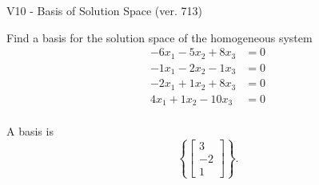 \begin{exercise}
  \begin{exerciseTitle}V10 - Basis of Solution Space (ver. 713)\end{exerciseTitle}
  \begin{exerciseStatement}
    Find a basis for the solution space of the homogeneous system 
\begin{align*}
 -6 x_ 1 -5 x_ 2 + 8 x_ 3 &= 0  \\ 
  -1 x_ 1 -2 x_ 2 -1 x_ 3 &= 0  \\ 
  -2 x_ 1 + 1 x_ 2 + 8 x_ 3 &= 0  \\ 
  4 x_ 1 + 1 x_ 2 -10 x_ 3 &= 0  \\ 
 \end{align*}


 
  \end{exerciseStatement}

  \begin{exerciseAnswer}
   A basis is   
\[\left\{\left[\begin{array}{c}
3 \\
-2 \\
1
\end{array}\right]\right\}.\]

  


  \end{exerciseAnswer}
\end{exercise}